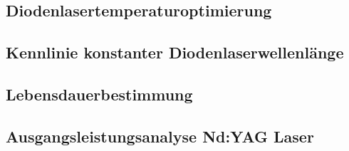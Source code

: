 \documentclass[../main.tex]{subfiles}
\begin{document}
    \subsection{Diodenlasertemperaturoptimierung}\label{subsec:1-1:Diodenlasertemperaturoptimierung}
        

    \subsection{Kennlinie konstanter Diodenlaserwellenlänge}\label{subsec:1-2:KennlinieKonstanterDiodenlaserwellenlaenge}
        

    \subsection{Lebensdauerbestimmung}\label{subsec:1-3:Lebensdauerbestimmung}
        

    \subsection{Ausgangsleistungsanalyse Nd:YAG Laser}\label{subsec:1-4:AusgangsleistungsanalyseNdYAGLaser}
        

    

    

    

    

    

    

    
    
\end{document}
